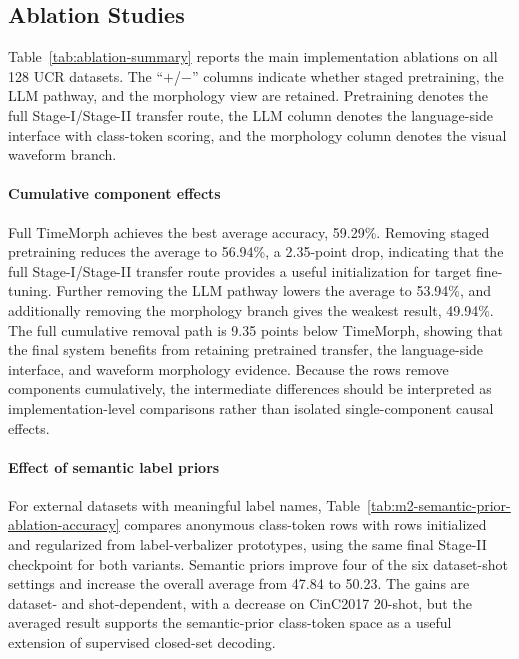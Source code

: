 \documentclass[10pt,journal,compsoc]{IEEEtran}
\begin{document}
\subsection{Ablation Studies}
Table~\ref{tab:ablation-summary} reports the main implementation ablations on all 128 UCR datasets.
The ``$+$/$-$'' columns indicate whether staged pretraining, the LLM pathway, and the morphology view are retained.
Pretraining denotes the full Stage-I/Stage-II transfer route, the LLM column denotes the language-side interface with class-token scoring, and the morphology column denotes the visual waveform branch.


\paragraph{Cumulative component effects}
Full TimeMorph achieves the best average accuracy, 59.29\%.
Removing staged pretraining reduces the average to 56.94\%, a 2.35-point drop, indicating that the full Stage-I/Stage-II transfer route provides a useful initialization for target fine-tuning.
Further removing the LLM pathway lowers the average to 53.94\%, and additionally removing the morphology branch gives the weakest result, 49.94\%.
The full cumulative removal path is 9.35 points below TimeMorph, showing that the final system benefits from retaining pretrained transfer, the language-side interface, and waveform morphology evidence.
Because the rows remove components cumulatively, the intermediate differences should be interpreted as implementation-level comparisons rather than isolated single-component causal effects.

\paragraph{Effect of semantic label priors}
For external datasets with meaningful label names, Table~\ref{tab:m2-semantic-prior-ablation-accuracy} compares anonymous class-token rows with rows initialized and regularized from label-verbalizer prototypes, using the same final Stage-II checkpoint for both variants.
Semantic priors improve four of the six dataset-shot settings and increase the overall average from 47.84 to 50.23.
The gains are dataset- and shot-dependent, with a decrease on CinC2017 20-shot, but the averaged result supports the semantic-prior class-token space as a useful extension of supervised closed-set decoding.


\end{document}
